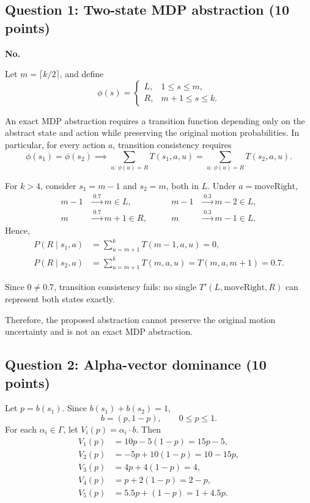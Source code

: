 \documentclass[11pt,a4paper]{article}
\begin{document}
\subsection*{Question 1: Two-state MDP abstraction (10 points)}
\label{sec:a1}
\begingroup
\setlength{\parindent}{0pt}
\setlength{\parskip}{4pt}
\noindent\textbf{No.}

Let $m=\lceil k/2\rceil$, and define
\[
\phi(s)=
\begin{cases}
L, & 1\le s\le m,\\
R, & m+1\le s\le k.
\end{cases}
\]

An exact MDP abstraction requires a transition function depending only
on the abstract state and action while preserving the original motion
probabilities. In particular, for every action $a$, transition consistency requires
\[
\phi(s_1)=\phi(s_2)
\implies
\sum_{u:\,\phi(u)=R}T(s_1,a,u)
=
\sum_{u:\,\phi(u)=R}T(s_2,a,u).
\]

For $k>4$, consider $s_1=m-1$ and $s_2=m$, both in $L$.
Under $a=\mathrm{moveRight}$,
\[
\begin{aligned}
m-1&\xrightarrow{\,0.7\,}m\in L,
&\qquad m-1&\xrightarrow{\,0.3\,}m-2\in L,\\
m&\xrightarrow{\,0.7\,}m+1\in R,
&\qquad m&\xrightarrow{\,0.3\,}m-1\in L.
\end{aligned}
\]
Hence,
\[
\begin{aligned}
P(R\mid s_1,a)
&=\sum_{u=m+1}^{k}T(m-1,a,u)=0,\\
P(R\mid s_2,a)
&=\sum_{u=m+1}^{k}T(m,a,u)
=T(m,a,m+1)=0.7.
\end{aligned}
\]

Since $0\neq0.7$, transition consistency fails:
no single $T'(L,\mathrm{moveRight},R)$ can represent both states exactly.

Therefore, the proposed abstraction cannot preserve the original motion
uncertainty and is not an exact MDP abstraction.
\par
\endgroup

\clearpage
\subsection*{Question 2: Alpha-vector dominance (10 points)}
\label{sec:a2}
\begingroup
\setlength{\parindent}{0pt}
\setlength{\parskip}{4pt}

Let $p=b(s_1)$. Since $b(s_1)+b(s_2)=1$,
\[
b=(p,1-p),\qquad 0\le p\le1.
\]
For each $\alpha_i\in\Gamma$, let $V_i(p)=\alpha_i\cdot b$. Then
\[
\begin{aligned}
V_1(p)&=10p-5(1-p)=15p-5,\\
V_2(p)&=-5p+10(1-p)=10-15p,\\
V_3(p)&=4p+4(1-p)=4,\\
V_4(p)&=p+2(1-p)=2-p,\\
V_5(p)&=5.5p+(1-p)=1+4.5p.
\end{aligned}
\]
\end{document}
